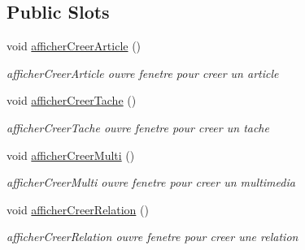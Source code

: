 \subsection*{Public Slots}
\begin{DoxyCompactItemize}
\item 
\mbox{\label{class_fenetre_principale_a8ccbf1f04c52130f106ff14ec427709f}} 
void \hyperlink{class_fenetre_principale_a8ccbf1f04c52130f106ff14ec427709f}{afficher\+Creer\+Article} ()
\begin{DoxyCompactList}\small\item\em afficher\+Creer\+Article ouvre fenetre pour creer un article \end{DoxyCompactList}\item 
\mbox{\label{class_fenetre_principale_af572d9ec04d80f65bd8dd27616d2ea1f}} 
void \hyperlink{class_fenetre_principale_af572d9ec04d80f65bd8dd27616d2ea1f}{afficher\+Creer\+Tache} ()
\begin{DoxyCompactList}\small\item\em afficher\+Creer\+Tache ouvre fenetre pour creer un tache \end{DoxyCompactList}\item 
\mbox{\label{class_fenetre_principale_a0c1fbc3e1e5a8921d989a2d4c4116397}} 
void \hyperlink{class_fenetre_principale_a0c1fbc3e1e5a8921d989a2d4c4116397}{afficher\+Creer\+Multi} ()
\begin{DoxyCompactList}\small\item\em afficher\+Creer\+Multi ouvre fenetre pour creer un multimedia \end{DoxyCompactList}\item 
\mbox{\label{class_fenetre_principale_a154654b4aaf695be6445ff0d42c2669c}} 
void \hyperlink{class_fenetre_principale_a154654b4aaf695be6445ff0d42c2669c}{afficher\+Creer\+Relation} ()
\begin{DoxyCompactList}\small\item\em afficher\+Creer\+Relation ouvre fenetre pour creer une relation \end{DoxyCompactList}\item 
\mbox{\label{class_fenetre_principale_a78e23e66e42390fff9936f121f2b47b4}} 

\end{DoxyCompactItemize}
